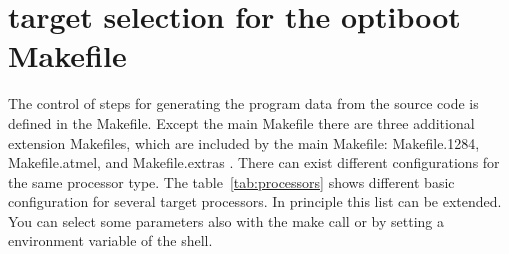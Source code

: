 \section{target selection for the optiboot Makefile}

The control of steps for generating the program data from
the source code is defined in the Makefile.
Except the main Makefile there are three additional extension Makefiles,
which are included by the main Makefile:
Makefile.1284, Makefile.atmel, and Makefile.extras .
There can exist different configurations for the same processor type.
The table~\ref{tab:processors} shows different basic configuration
for several target processors.
In principle this list can be extended.
You can select some parameters also with the make call or by setting
a environment variable  of the shell.


